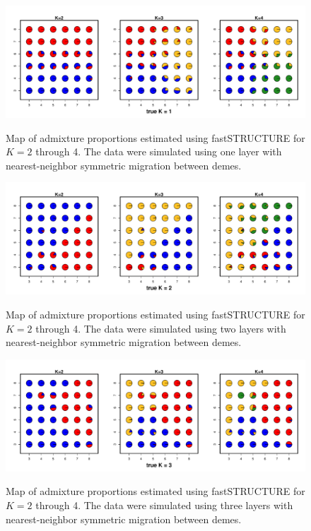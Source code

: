 \documentclass[10pt,letterpaper]{article}
\begin{document}
\begin{figure}
	\centering
		{\includegraphics[width=\textwidth]{figs/fastStr/fastStr_simK1_pies.pdf}}
	\caption{
	Map of admixture proportions estimated using fastSTRUCTURE \cite{fastStructure} for $K=2$ through 4.
	The data were simulated using one layer with nearest-neighbor symmetric migration between demes.
    }\label{fastStr_simK1}
\end{figure}

\begin{figure}
	\centering
		{\includegraphics[width=\textwidth]{figs/fastStr/fastStr_simK2_pies.pdf}}
	\caption{
	Map of admixture proportions estimated using fastSTRUCTURE \cite{fastStructure} for $K=2$ through 4.
	The data were simulated using two layers with nearest-neighbor symmetric migration between demes.
    }\label{fastStr_simK2}
\end{figure}

\begin{figure}
	\centering
		{\includegraphics[width=\textwidth]{figs/fastStr/fastStr_simK3_pies.pdf}}
	\caption{
	Map of admixture proportions estimated using fastSTRUCTURE \cite{fastStructure} for $K=2$ through 4.
	The data were simulated using three layers with nearest-neighbor symmetric migration between demes.
    }\label{fastStr_simK3}
\end{figure}
\end{document}
